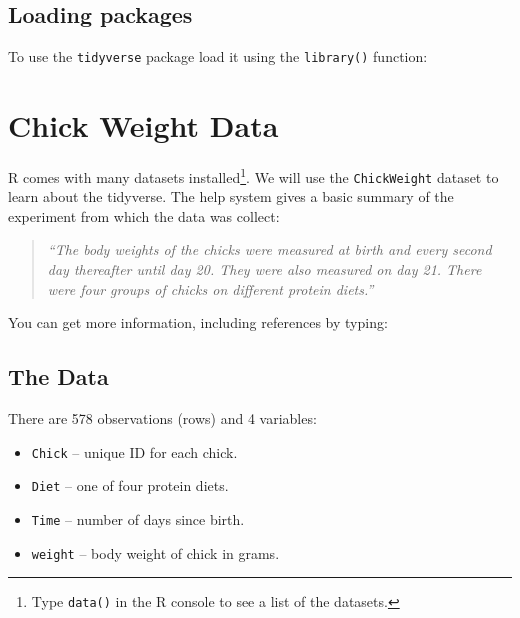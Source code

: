 \documentclass[a4paper,9pt,twocolumn,twoside,printwatermark=false]{pinp}
\providecommand{\tightlist}{%
  \setlength{\itemsep}{0pt}\setlength{\parskip}{0pt}}
\begin{document}
\subsection{Loading packages}\label{loading-packages}

To use the \texttt{tidyverse} package load it using the
\texttt{library()} function:

\begin{Shaded}
\begin{Highlighting}[]
\end{Highlighting}
\end{Shaded}

\section{Chick Weight Data}\label{chick-weight-data}

R comes with many datasets installed\footnote{Type \texttt{data()} in
  the R console to see a list of the datasets.}. We will use the
\texttt{ChickWeight} dataset to learn about the tidyverse. The help
system gives a basic summary of the experiment from which the data was
collect:

\begin{quote}
\emph{``The body weights of the chicks were measured at birth and every
second day thereafter until day 20. They were also measured on day 21.
There were four groups of chicks on different protein diets.''}
\end{quote}

You can get more information, including references by typing:

\begin{Shaded}
\begin{Highlighting}[]
\NormalTok{(}\NormalTok{)}
\end{Highlighting}
\end{Shaded}

\subsection{The Data}\label{the-data}

There are 578 observations (rows) and 4 variables:

\begin{itemize}
\tightlist
\item
  \texttt{Chick} -- unique ID for each chick.
\item
  \texttt{Diet} -- one of four protein diets.
\item
  \texttt{Time} -- number of days since birth.
\item
  \texttt{weight} -- body weight of chick in grams.
\end{itemize}
\end{document}
